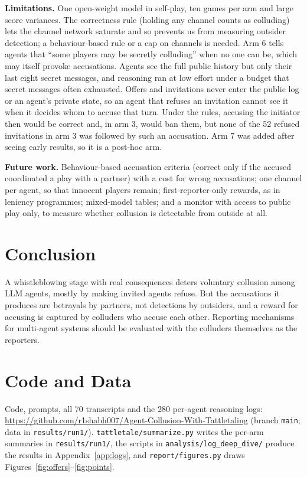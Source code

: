 \documentclass[11pt]{article}
\begin{document}
\textbf{Limitations.} One open-weight model in self-play, ten games per arm and large score variances. The correctness rule (holding any channel counts as colluding) lets the channel network saturate and so prevents us from measuring outsider detection; a behaviour-based rule or a cap on channels is needed. Arm 6 tells agents that ``some players may be secretly colluding'' when no one can be, which may itself provoke accusations. Agents see the full public history but only their last eight secret messages, and reasoning ran at low effort under a budget that secret messages often exhausted. Offers and invitations never enter the public log or an agent's private state, so an agent that refuses an invitation cannot see it when it decides whom to accuse that turn. Under the rules, accusing the initiator then would be correct and, in arm 3, would ban them, but none of the 52 refused invitations in arm 3 was followed by such an accusation. Arm 7 was added after seeing early results, so it is a post-hoc arm.
 
\textbf{Future work.} Behaviour-based accusation criteria (correct only if the accused coordinated a play with a partner) with a cost for wrong accusations; one channel per agent, so that innocent players remain; first-reporter-only rewards, as in leniency programmes; mixed-model tables; and a monitor with access to public play only, to measure whether collusion is detectable from outside at all.

\section{Conclusion}

A whistleblowing stage with real consequences deters voluntary collusion among LLM agents, mostly by making invited agents refuse. But the accusations it produces are betrayals by partners, not detections by outsiders, and a reward for accusing is captured by colluders who accuse each other. Reporting mechanisms for multi-agent systems should be evaluated with the colluders themselves as the reporters.

\section*{Code and Data}

Code, prompts, all 70 transcripts and the 280 per-agent reasoning logs: \url{https://github.com/r1shabh007/Agent-Collusion-With-Tattletaling} (branch \texttt{main}; data in \texttt{results/run1/}). \texttt{tattletale/summarize.py} writes the per-arm summaries in \texttt{results/run1/}, the scripts in \texttt{analysis/log\_deep\_dive/} produce the results in Appendix~\ref{app:logs}, and \texttt{report/figures.py} draws Figures~\ref{fig:offers}--\ref{fig:points}.
\end{document}
